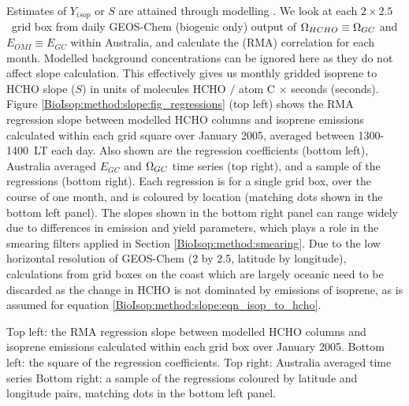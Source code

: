     
    Estimates of $Y_{isop}$ or $S$ are attained through modelling \parencite[e.g.][]{Millet2006}.
    We look at each $2\times2.5$~\degr grid box from daily GEOS-Chem (biogenic only) output of $\Omega_{HCHO} \equiv \Omega_{GC}$ and $E_{OMI} \equiv E_{GC}$ within Australia, and calculate the (RMA) correlation for each month.
    Modelled background concentrations can be ignored here as they do not affect slope calculation.
    This effectively gives us monthly gridded isoprene to HCHO slope ($S$) in units of molecules HCHO $/$ atom C $\times$ seconds (seconds).
    Figure \ref{BioIsop:method:slope:fig_regressions} (top left) shows the RMA regression slope between modelled HCHO columns and isoprene emissions calculated within each grid square over January 2005, averaged between 1300-1400~LT each day.
    Also shown are the regression coefficients (bottom left), Australia averaged $E_{GC}$ and $\Omega_{GC}$ time series (top right), and a sample of the regressions (bottom right).
    Each regression is for a single grid box, over the course of one month, and is coloured by location (matching dots shown in the bottom left panel).
    The slopes shown in the bottom right panel can range widely due to differences in emission and yield parameters, which plays a role in the smearing filters applied in Section \ref{BioIsop:method:smearing}.
    Due to the low horizontal resolution of GEOS-Chem (2 by 2.5\degr, latitude by longitude), calculations from grid boxes on the coast which are largely oceanic need to be discarded as the change in HCHO is not dominated by emissions of isoprene, as is assumed for equation \ref{BioIsop:method:slope:eqn_isop_to_hcho}.
    
    
    { %
      Top left: the RMA regression slope between modelled HCHO columns and isoprene emissions calculated within each grid box over January 2005.
      Bottom left: the square of the regression coefficients.
      Top right: Australia averaged time series 
      Bottom right: a sample of the regressions coloured by latitude and longitude pairs, matching dots in the bottom left panel.
    }
    {\label{BioIsop:method:slope:fig_regressions}}
    
